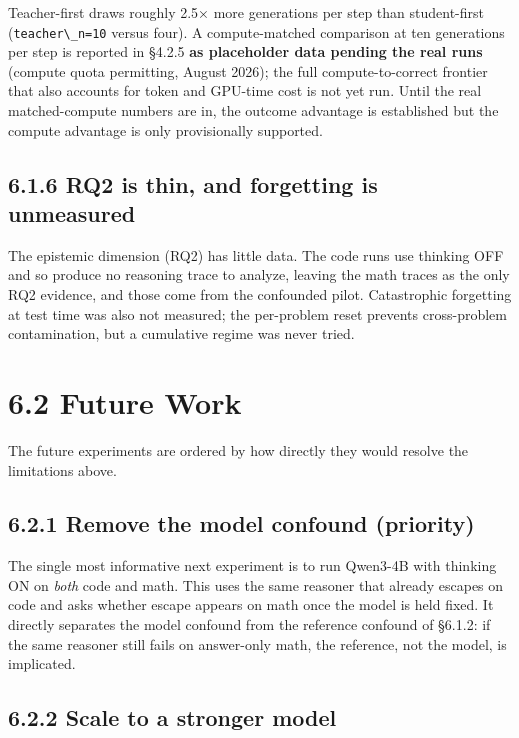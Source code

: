 Teacher-first draws roughly 2.5× more generations per step than student-first (\passthrough{\lstinline!teacher\_n=10!} versus four). A compute-matched comparison at ten generations per step is reported in §4.2.5 \textbf{as placeholder data pending the real runs} (compute quota permitting, August 2026); the full compute-to-correct frontier that also accounts for token and GPU-time cost is not yet run. Until the real matched-compute numbers are in, the outcome advantage is established but the compute advantage is only provisionally supported.

\subsection{6.1.6 RQ2 is thin, and forgetting is unmeasured}\label{rq2-is-thin-and-forgetting-is-unmeasured}

The epistemic dimension (RQ2) has little data. The code runs use thinking OFF and so produce no reasoning trace to analyze, leaving the math traces as the only RQ2 evidence, and those come from the confounded pilot. Catastrophic forgetting at test time was also not measured; the per-problem reset prevents cross-problem contamination, but a cumulative regime was never tried.

\section{6.2 Future Work}\label{future-work}

The future experiments are ordered by how directly they would resolve the limitations above.

\subsection{6.2.1 Remove the model confound (priority)}\label{remove-the-model-confound-priority}

The single most informative next experiment is to run Qwen3-4B with thinking ON on \emph{both} code and math. This uses the same reasoner that already escapes on code and asks whether escape appears on math once the model is held fixed. It directly separates the model confound from the reference confound of §6.1.2: if the same reasoner still fails on answer-only math, the reference, not the model, is implicated.

\subsection{6.2.2 Scale to a stronger model}\label{scale-to-a-stronger-model}

